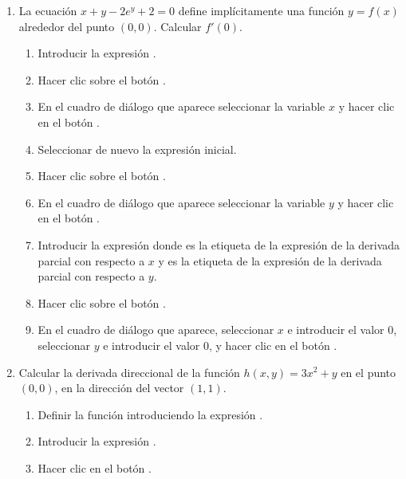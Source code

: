 \begin{enumerate}[leftmargin=*]
\item La ecuación $x+y-2e^y+2=0$ define implícitamente una función $y=f(x)$ alrededor del punto $(0,0)$. Calcular
$f'(0)$.
\begin{indicacion}
\begin{enumerate}
\item Introducir la expresión .
\item Hacer clic sobre el botón .
\item En el cuadro de diálogo que aparece seleccionar la variable $x$ y hacer clic en el botón . 
\item Seleccionar de nuevo la expresión inicial.
\item Hacer clic sobre el botón .
\item En el cuadro de diálogo que aparece seleccionar la variable $y$ y hacer clic en el botón .
\item Introducir la expresión  donde  es la etiqueta de la expresión de la derivada
parcial con respecto a $x$ y  es la etiqueta de la expresión de la derivada parcial con respecto a $y$.
\item Hacer clic sobre el botón .
\item En el cuadro de diálogo que aparece, seleccionar $x$ e introducir el valor $0$, seleccionar $y$ e
introducir el valor $0$, y hacer clic en el botón .
\end{enumerate}
\end{indicacion}

\item Calcular la derivada direccional de la función $h(x,y)= 3x^2+y$ en el punto $(0,0)$, en la dirección del vector
$(1,1)$.
\begin{indicacion}
\begin{enumerate}
\item Definir la función introduciendo la expresión .
\item Introducir la expresión .
\item Hacer clic en el botón .
\end{enumerate}
\end{indicacion}


\end{enumerate}
